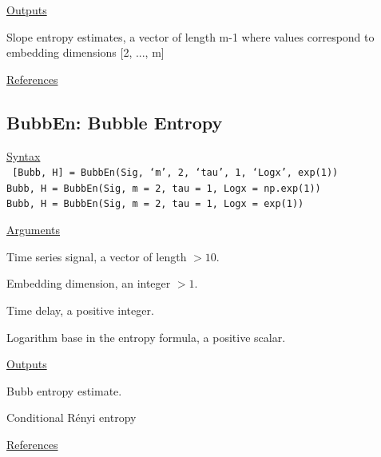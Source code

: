 \documentclass[12pt, a4paper, titlepage, openany]{book}
\begin{document}
\noindent \ul{Outputs}
\begin{description}[labelsep=1cm, labelwidth=2cm, nosep, style=multiline,leftmargin=3cm]\footnotesize
\item[\texttt{Slop}]	Slope entropy estimates, a vector of length m-1 where values correspond to embedding dimensions [2, ..., m]
\end{description}

\noindent \ul{References}\hspace{1cm}
\cite{Slop1}



\newpage
\subsection{\normalsize BubbEn: \hspace{15mm} Bubble Entropy}
\noindent\ul{Syntax} \vspace{6mm} \\ \noindent \texttt{\footnotesize
[Bubb, H] = BubbEn(Sig, ‘m’, 2, ‘tau’, 1, ‘Logx’, exp(1)) \\
Bubb, H = BubbEn(Sig, m = 2, tau = 1, Logx = np.exp(1)) \\
Bubb, H = BubbEn(Sig, m = 2, tau = 1, Logx = exp(1))}

\noindent \ul{Arguments}
\begin{description}[labelsep=1cm, labelwidth=2cm, nosep, style=multiline,leftmargin=3cm]\footnotesize
\item[\texttt{Sig}]		Time series signal, a vector of length $> 10$.
\item[\texttt{m}]		Embedding dimension, an integer $ > 1$.
\item[\texttt{tau}]		Time delay, a positive integer.
\item[\texttt{Logx}]	Logarithm base in the entropy formula, a positive scalar.\\
\end{description}

\noindent \ul{Outputs}
\begin{description}[labelsep=1cm, labelwidth=2cm, nosep, style=multiline,leftmargin=3cm]\footnotesize
\item[\texttt{Bubb}]	Bubb entropy estimate.
\item[\texttt{H}]	Conditional Rényi entropy
\end{description}

\noindent \ul{References}\hspace{1cm}
\cite{Bubb1}
\end{document}
